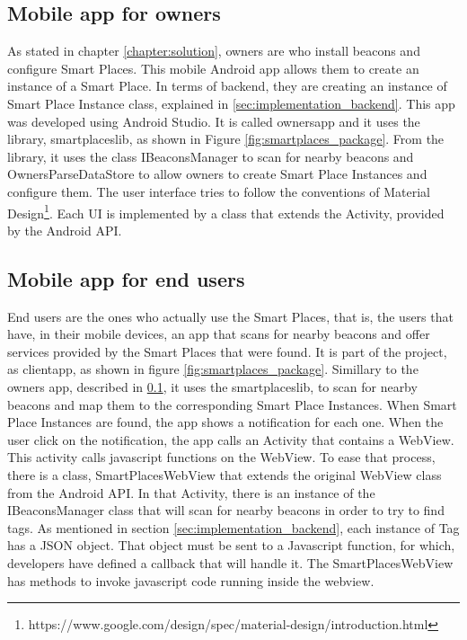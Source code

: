 \subsection{Mobile app for owners}
\label{sub:implementation_mobile_app_for_owners}
As stated in chapter \ref{chapter:solution}, owners are who install beacons and configure Smart Places. This mobile Android app allows them to create an instance of a Smart Place.
In terms of backend, they are creating an instance of Smart Place Instance class, explained in \ref{sec:implementation_backend}.
This app was developed using Android Studio.
It is called ownersapp and it uses the library, smartplaceslib, as shown in Figure \ref{fig:smartplaces_package}.
From the library, it uses the class IBeaconsManager to scan for nearby beacons and OwnersParseDataStore to allow owners to create Smart Place Instances and configure them.
The user interface tries to follow the conventions of Material Design\footnote{https://www.google.com/design/spec/material-design/introduction.html}.
Each \gls{UI} is implemented by a class that extends the Activity, provided by the Android API.

\subsection{Mobile app for end users}
\label{sub:implementation_mobile_app_for_end_users}
End users are the ones who actually use the Smart Places, that is, the users that have, in their mobile devices, an app that scans for nearby beacons and offer services provided by the Smart Places that were found.
It is part of the project, as clientapp, as shown in figure \ref{fig:smartplaces_package}. Simillary to the owners app, described in \ref{sub:implementation_mobile_app_for_owners}, it uses the smartplaceslib, to scan for nearby beacons and map them to the corresponding Smart Place Instances.
When Smart Place Instances are found, the app shows a notification for each one.
When the user click on the notification, the app calls an Activity that contains a WebView. This activity calls javascript functions on the WebView.
To ease that process, there is a class, SmartPlacesWebView that extends the original WebView class from the Android \gls{API}.
In that Activity, there is an instance of the IBeaconsManager class that will scan for nearby beacons in order to try to find tags. As mentioned in section \ref{sec:implementation_backend},
each instance of Tag has a \gls{JSON} object. That object must be sent to a Javascript function, for which, developers have defined a callback that will handle it. The SmartPlacesWebView has methods to invoke javascript code running inside the webview.

